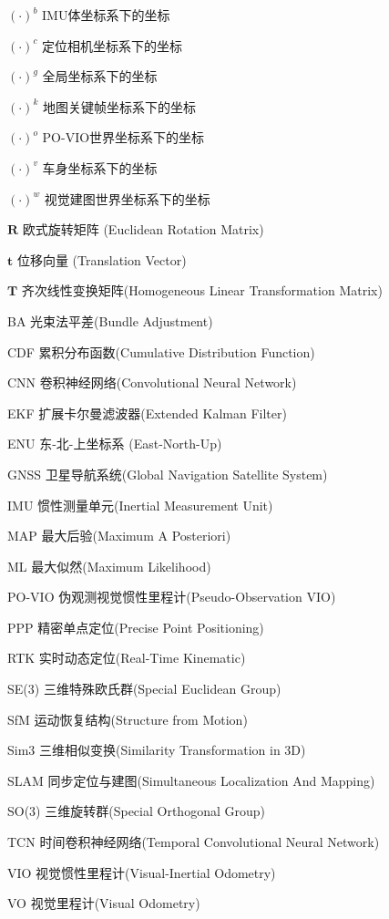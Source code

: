 
\begin{denotation}[3cm]
  \item[$(\cdot)^{b}$] IMU体坐标系下的坐标
  \item[$(\cdot)^{c}$] 定位相机坐标系下的坐标
  \item[$(\cdot)^{g}$] 全局坐标系下的坐标
  \item[$(\cdot)^{k}$] 地图关键帧坐标系下的坐标
  \item[$(\cdot)^{o}$] PO-VIO世界坐标系下的坐标
  \item[$(\cdot)^{v}$] 车身坐标系下的坐标
  \item[$(\cdot)^{w}$] 视觉建图世界坐标系下的坐标
  \item[$\symbf{R}$] 欧式旋转矩阵 (Euclidean Rotation Matrix)
  \item[$\symbf{t}$] 位移向量 (Translation Vector)
  \item[$\symbf{T}$] 齐次线性变换矩阵(Homogeneous Linear Transformation Matrix)
  \item[BA] 光束法平差(Bundle Adjustment) 
  \item[CDF] 累积分布函数(Cumulative Distribution Function)
  \item[CNN] 卷积神经网络(Convolutional Neural Network)
  \item[EKF] 扩展卡尔曼滤波器(Extended Kalman Filter)
  \item[ENU] 东-北-上坐标系 (East-North-Up)
  \item[GNSS] 卫星导航系统(Global Navigation Satellite System)
  \item[IMU] 惯性测量单元(Inertial Measurement Unit)
  \item[MAP] 最大后验(Maximum A Posteriori)
  \item[ML] 最大似然(Maximum Likelihood) 
  \item[PO-VIO] 伪观测视觉惯性里程计(Pseudo-Observation VIO)
  \item[PPP] 精密单点定位(Precise Point Positioning)
  \item[RTK] 实时动态定位(Real-Time Kinematic)
  \item[SE(3)] 三维特殊欧氏群(Special Euclidean Group)
  \item[SfM] 运动恢复结构(Structure from Motion) 
  \item[Sim3] 三维相似变换(Similarity Transformation in 3D) 
  \item[SLAM] 同步定位与建图(Simultaneous Localization And Mapping)
  \item[SO(3)] 三维旋转群(Special Orthogonal Group)
  \item[TCN] 时间卷积神经网络(Temporal Convolutional Neural Network) 
  \item[VIO] 视觉惯性里程计(Visual-Inertial Odometry)
  \item[VO] 视觉里程计(Visual Odometry)
\end{denotation}



